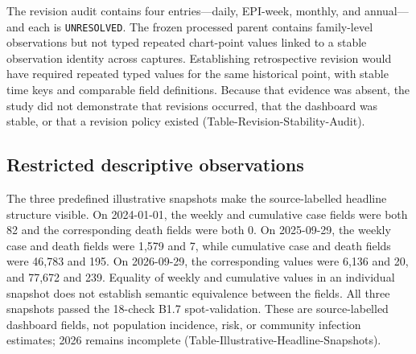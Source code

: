 The revision audit contains four entries---daily, EPI-week, monthly, and annual---and each is \texttt{UNRESOLVED}. The frozen processed parent contains family-level observations but not typed repeated chart-point values linked to a stable observation identity across captures. Establishing retrospective revision would have required repeated typed values for the same historical point, with stable time keys and comparable field definitions. Because that evidence was absent, the study did not demonstrate that revisions occurred, that the dashboard was stable, or that a revision policy existed (Table-Revision-Stability-Audit).

\subsection{Restricted descriptive observations}

The three predefined illustrative snapshots make the source-labelled headline structure visible. On 2024-01-01, the weekly and cumulative case fields were both 82 and the corresponding death fields were both 0. On 2025-09-29, the weekly case and death fields were 1,579 and 7, while cumulative case and death fields were 46,783 and 195. On 2026-09-29, the corresponding values were 6,136 and 20, and 77,672 and 239. Equality of weekly and cumulative values in an individual snapshot does not establish semantic equivalence between the fields. All three snapshots passed the 18-check B1.7 spot-validation. These are source-labelled dashboard fields, not population incidence, risk, or community infection estimates; 2026 remains incomplete (Table-Illustrative-Headline-Snapshots).
